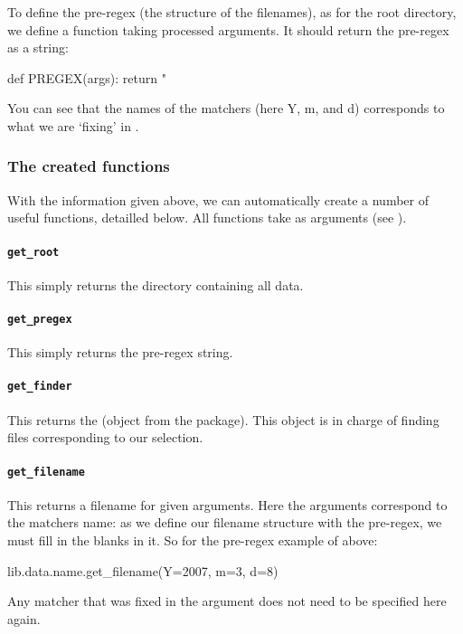 To define the pre-regex (the structure of the filenames), as for the root directory, we define a function taking processed arguments.
It should return the pre-regex as a string:
\begin{python}
def PREGEX(args):
    return "%
\end{python}

You can see that the names of the matchers (here Y, m, and d) corresponds to what we are `fixing' in .

\subsubsection{The created functions}
\label{sec:org-created-funcs}

With the information given above, we can automatically create a number of useful functions, detailled below.
All functions take as arguments  (see ).
\paragraph{\texttt{get\_root}}
This simply returns the directory containing all data.

\paragraph{\texttt{get\_pregex}}
This simply returns the pre-regex string.

\paragraph{\texttt{get\_finder}}
This returns the  (object from the  package).
This object is in charge of finding files corresponding to our selection.

\paragraph{\texttt{get\_filename}}
This returns a filename for given arguments.
Here the arguments correspond to the matchers name: as we define our filename structure with the pre-regex, we must fill in the blanks in it.
So for the pre-regex example of above:
\begin{python}
lib.data.name.get_filename(Y=2007, m=3, d=8)
\end{python}
Any matcher that was fixed in the  argument does not need to be specified here again.

